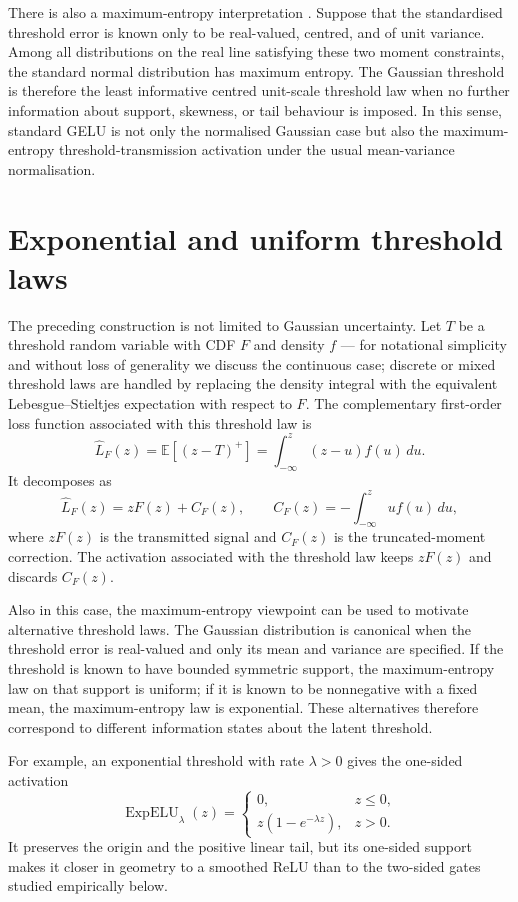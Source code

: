 \documentclass[11pt]{article}
\begin{document}
There is also a maximum-entropy interpretation \cite{jaynes03}.
Suppose that the standardised threshold error is known only to be real-valued, centred, and of unit variance.
Among all distributions on the real line satisfying these two moment constraints, the standard normal distribution has maximum entropy.
The Gaussian threshold is therefore the least informative centred unit-scale threshold law when no further information about support, skewness, or tail behaviour is imposed.
In this sense, standard GELU is not only the normalised Gaussian case but also the maximum-entropy threshold-transmission activation under the usual mean-variance normalisation.

\section{Exponential and uniform threshold laws}
\label{sec:alternative-activations}

The preceding construction is not limited to Gaussian uncertainty. Let $T$ be a threshold random variable with CDF $F$ and density $f$ --- for notational simplicity and without loss of generality we discuss the continuous case; discrete or mixed threshold laws are handled by replacing the density integral with the equivalent Lebesgue--Stieltjes expectation with respect to $F$.
The complementary first-order loss function associated with this threshold law is
$$
\widehat{L}_F(z)
=
\mathbb{E}[(z-T)^+]
=
\int_{-\infty}^{z}(z-u)f(u)\,du.
$$
It decomposes as
$$
\widehat{L}_F(z)
=
zF(z)+C_F(z),
\qquad
C_F(z)=-\int_{-\infty}^{z}u f(u)\,du,
$$
where $zF(z)$ is the transmitted signal and $C_F(z)$ is the truncated-moment correction. The activation associated with the threshold law keeps $zF(z)$ and discards $C_F(z)$.

Also in this case, the maximum-entropy viewpoint can be used to motivate alternative threshold laws. The Gaussian distribution is canonical when the threshold error is real-valued and only its mean and variance are specified. If the threshold is known to have bounded symmetric support, the maximum-entropy law on that support is uniform; if it is known to be nonnegative with a fixed mean, the maximum-entropy law is exponential. These alternatives therefore correspond to different information states about the latent threshold.

For example, an exponential threshold with rate $\lambda>0$ gives the one-sided activation
$$
\operatorname{ExpELU}_{\lambda}(z)
=
\begin{cases}
0, & z\le 0,\\
z(1-e^{-\lambda z}), & z>0.
\end{cases}
$$
It preserves the origin and the positive linear tail, but its one-sided support makes it closer in geometry to a smoothed ReLU than to the two-sided gates studied empirically below. 
\end{document}
